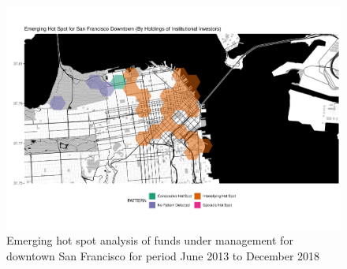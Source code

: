 \begin{figure}
	\centering
	\includegraphics[width=1\linewidth]{Figures/ChapterIV/SF_Money_EH_Downtown}
	\caption[Emerging Hot Spot Analysis of Funds Under Management for Downtown San Francisco 2013-2018]{Emerging hot spot analysis of funds under management for downtown San Francisco for period June 2013 to December 2018}
	\label{fig:SFnmoneyhotspot_Downtown}
\end{figure}


